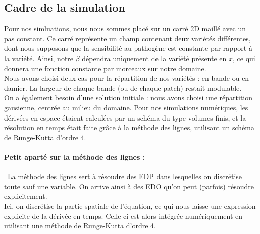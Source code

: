 \documentclass{article}
\begin{document}
\subsection{Cadre de la simulation}
Pour nos simluations, nous nous sommes placé sur un carré 2D maillé avec un pas constant. Ce carré représente un champ contenant deux variétés différentes, dont nous supposons que la sensibilité au pathogène est constante par rapport à la variété. Ainsi, notre $\beta$ dépendra uniquement de la variété présente en $x$, ce qui donnera une fonction constante par morceaux sur notre domaine.\\
Nous avons choisi deux cas pour la répartition de nos variétés : en bande ou en damier. La largeur de chaque bande (ou de chaque patch) restait modulable.\\
On a également besoin d'une solution initiale : nous avons choisi une répartition gausienne, centrée au milieu du domaine.
Pour nos simulations numériques, les dérivées en espace étaient calculées par un schéma du type volumes finis, et la résolution en temps était faite grâce à la méthode des lignes, utilisant un schéma de Runge-Kutta d'ordre 4.\\
\paragraph{Petit aparté sur la méthode des lignes :} La méthode des lignes sert à résoudre des EDP dans lesquelles on discrétise toute sauf une variable. On arrive ainsi à des EDO qu'on peut (parfois) résoudre explicitement.\\
Ici, on discrétise la partie spatiale de l'équation, ce qui nous laisse une expression explicite de la dérivée en temps. Celle-ci est alors intégrée numériquement en utilisant une méthode de Runge-Kutta d'ordre 4.
\end{document}
